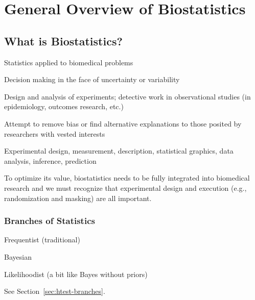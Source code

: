 \chapter{General Overview of Biostatistics}    \label{chap:overview}



\section{What is Biostatistics?}\label{sec:overview-biostat}
\bi
\item Statistics applied to biomedical problems
\item Decision making in the face of uncertainty or variability
\item Design and analysis of experiments; detective work in
  observational studies (in epidemiology, outcomes research, etc.)
\item Attempt to remove bias or find alternative explanations to those
  posited by researchers with vested interests
\item Experimental design, measurement, description, statistical graphics,
  data analysis, inference, prediction
  \ei

To optimize its value, biostatistics needs to be fully integrated into
biomedical research and we must recognize that experimental design and
execution (e.g., randomization and masking) are all important.

\subsection{Branches of Statistics}
\bi
\item Frequentist (traditional)
\item Bayesian
\item Likelihoodist (a bit like Bayes without priors)
\ei

See Section~\ref{sec:htest-branches}.


